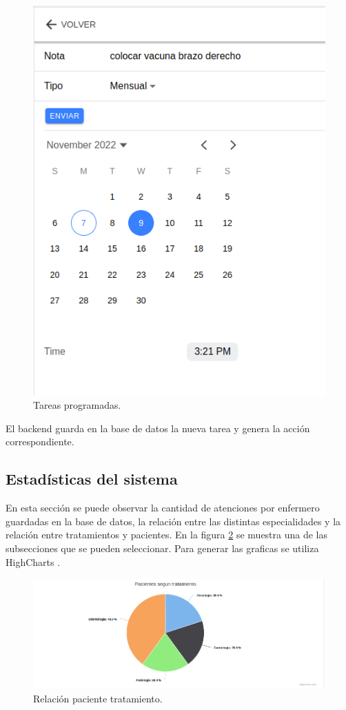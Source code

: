 \begin{figure}[ht]
	\centering
	\includegraphics[scale=.40]{./Figures/tarea-programada.png}
	\caption{Tareas programadas.}
	\label{fig:Tareas programadas.}
\end{figure} 

El backend guarda en la base de datos la nueva tarea y genera la acción correspondiente.

\subsection{Estadísticas del sistema}

En esta sección se puede observar la cantidad de atenciones por enfermero guardadas en la base de datos, la relación entre las distintas especialidades y la relación entre tratamientos y pacientes. En la figura \ref{fig:Relación paciente tratamiento.} se muestra una de las subsecciones que se pueden seleccionar. Para generar las graficas se utiliza HighCharts \citep{WEBSITE:33}. 
\begin{figure}[ht]
	\centering
	\includegraphics[scale=.40]{./Figures/web/pacientes-Tratamiento.png}
	\caption{Relación paciente tratamiento.}
	\label{fig:Relación paciente tratamiento.}
\end{figure} 


